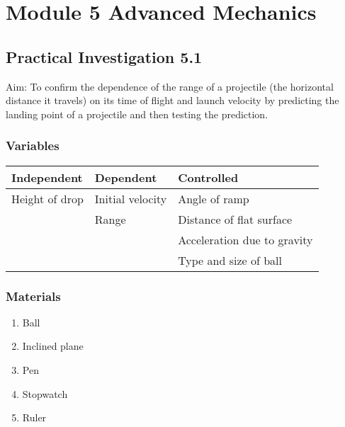 
\chapter{Module 5 \; Advanced Mechanics}

\section{Practical Investigation 5.1}
	Aim: To confirm the dependence of the range of a projectile (the horizontal distance it travels) on its time of flight and launch velocity by predicting the landing point of a projectile and then testing the prediction.

	\subsection{Variables}
	\begin{table}[htbp]
		\centering
		\begin{tabular}{l|l|l}
			Independent & Dependent & Controlled \\ \hline
			Height of drop 	& Initial velocity 	& Angle of ramp \\
			 				& Range 			& Distance of flat surface \\
			 				& 					& Acceleration due to gravity \\
			 				& 					& Type and size of ball \\ 
		\end{tabular}
	\end{table}

	\subsection{Materials}
	\begin{enumerate}
		\item Ball
		\item Inclined plane
		\item Pen
		\item Stopwatch
		\item Ruler
	\end{enumerate}

